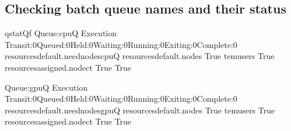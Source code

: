 \documentclass[a4paper,11pt,english]{sphinxmanual}
\begin{document}
\subsection{Checking batch queue names and their status}
\label{\detokenize{newfarm:checking-batch-queue-names-and-their-status}}
\begin{sphinxVerbatim}[commandchars=\\\{\}]
\PYGZdl{}\PYGZgt{}qstat\PYGZhy{}Qf
Queue:cpuQ
Execution
Transit:0Queued:0Held:0Waiting:0Running:0Exiting:0Complete:0
resources\PYGZus{}default.neednodescpuQ
resources\PYGZus{}default.nodes
True
tem\PYGZus{}users
True
resources\PYGZus{}assigned.nodect
True
True

Queue:gpuQ
Execution
Transit:0Queued:0Held:0Waiting:0Running:0Exiting:0Complete:0
resources\PYGZus{}default.neednodesgpuQ
resources\PYGZus{}default.nodes
True
tem\PYGZus{}users
True
resources\PYGZus{}assigned.nodect
True
True
\end{sphinxVerbatim}
\end{document}
